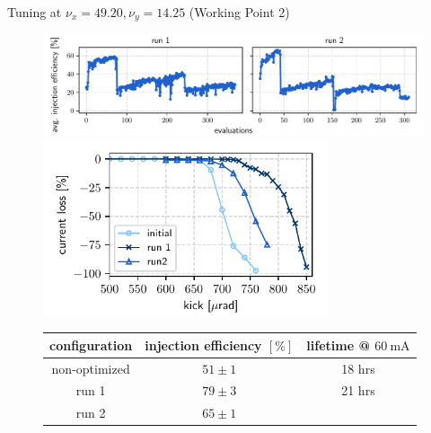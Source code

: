 \documentclass[aspectratio=169]{beamer}
\begin{document}
\begin{frame}{Tuning at $\nu_x = 49.20, \nu_y = 14.25$ (Working Point 2)}
    \begin{minipage}{0.55\textwidth}
        \begin{figure}
            \centering
            \includegraphics[width=\textwidth]{newtunes_history.pdf}
            \pause
            \includegraphics[width = 0.75\textwidth]{WEPL087_f3.pdf}
            \begin{table}[]
                \scriptsize
                \begin{tabular}{ccc}
                \hline
                configuration & injection efficiency $[\%]$ & lifetime @ $\unit{60~\milli\ampere}$ \\ \hline
                non-optimized    & $51\pm1$                 &  18 hrs \\
                run 1            & $79\pm3$                 &  21 hrs  \\
                run 2            & $65\pm1$                 &           \\ \hline
                \end{tabular}
                \end{table}
        \end{figure}
    \end{minipage}
    \hfill
    \begin{minipage}{0.44\textwidth}
        \begin{figure}
            \centering

\end{figure}
\end{minipage}
\end{frame}
\end{document}

